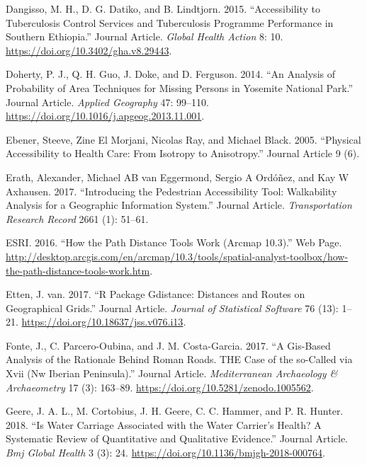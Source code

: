 \documentclass[]{elsarticle} %
\begin{document}
\leavevmode\hypertarget{ref-Dangisso2015}{}%
Dangisso, M. H., D. G. Datiko, and B. Lindtjorn. 2015. ``Accessibility
to Tuberculosis Control Services and Tuberculosis Programme Performance
in Southern Ethiopia.'' Journal Article. \emph{Global Health Action} 8:
10. \url{https://doi.org/10.3402/gha.v8.29443}.

\leavevmode\hypertarget{ref-Doherty2014analysis}{}%
Doherty, P. J., Q. H. Guo, J. Doke, and D. Ferguson. 2014. ``An Analysis
of Probability of Area Techniques for Missing Persons in Yosemite
National Park.'' Journal Article. \emph{Applied Geography} 47: 99--110.
\url{https://doi.org/10.1016/j.apgeog.2013.11.001}.

\leavevmode\hypertarget{ref-Ebener2005}{}%
Ebener, Steeve, Zine El Morjani, Nicolas Ray, and Michael Black. 2005.
``Physical Accessibility to Health Care: From Isotropy to Anisotropy.''
Journal Article 9 (6).

\leavevmode\hypertarget{ref-Erath2017pedestrian}{}%
Erath, Alexander, Michael AB van Eggermond, Sergio A Ordóñez, and Kay W
Axhausen. 2017. ``Introducing the Pedestrian Accessibility Tool:
Walkability Analysis for a Geographic Information System.'' Journal
Article. \emph{Transportation Research Record} 2661 (1): 51--61.

\leavevmode\hypertarget{ref-ESRI2016path}{}%
ESRI. 2016. ``How the Path Distance Tools Work (Arcmap 10.3).'' Web
Page.
\url{http://desktop.arcgis.com/en/arcmap/10.3/tools/spatial-analyst-toolbox/how-the-path-distance-tools-work.htm}.

\leavevmode\hypertarget{ref-vanEtten2017}{}%
Etten, J. van. 2017. ``R Package Gdistance: Distances and Routes on
Geographical Grids.'' Journal Article. \emph{Journal of Statistical
Software} 76 (13): 1--21. \url{https://doi.org/10.18637/jss.v076.i13}.

\leavevmode\hypertarget{ref-Fonte2017}{}%
Fonte, J., C. Parcero-Oubina, and J. M. Costa-Garcia. 2017. ``A
Gis-Based Analysis of the Rationale Behind Roman Roads. THE Case of the
so-Called via Xvii (Nw Iberian Peninsula).'' Journal Article.
\emph{Mediterranean Archaeology \& Archaeometry} 17 (3): 163--89.
\url{https://doi.org/10.5281/zenodo.1005562}.

\leavevmode\hypertarget{ref-Geere2018water}{}%
Geere, J. A. L., M. Cortobius, J. H. Geere, C. C. Hammer, and P. R.
Hunter. 2018. ``Is Water Carriage Associated with the Water Carrier's
Health? A Systematic Review of Quantitative and Qualitative Evidence.''
Journal Article. \emph{Bmj Global Health} 3 (3): 24.
\url{https://doi.org/10.1136/bmjgh-2018-000764}.
\end{document}
